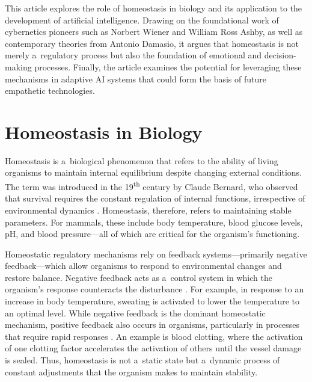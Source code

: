 \documentclass[%
  manuscript=article,
  year=2024,
  volume=77,
  doi=10.59203/zfn.77.706,
]{zfn}
\begin{document}
This article explores the role of homeostasis in biology and its application to the development of artificial intelligence. Drawing on the foundational work of cybernetics pioneers such as Norbert Wiener and William Ross Ashby, as well as contemporary theories from Antonio Damasio, it argues that homeostasis is not merely a~regulatory process but also the foundation of emotional and decision-making processes. Finally, the article examines the potential for leveraging these mechanisms in adaptive AI systems that could form the basis of future empathetic technologies.



\section*{Homeostasis in Biology}

Homeostasis is a~biological phenomenon that refers to the ability of living organisms to maintain internal equilibrium despite changing external conditions. The term was introduced in the 19\textsuperscript{th} century by Claude Bernard, who observed that survival requires the constant regulation of internal functions, irrespective of environmental dynamics 
\parencite[][]{fleming_walter_1984}. %
 Homeostasis, therefore, refers to maintaining stable parameters. For mammals, these include body temperature, blood glucose levels, pH, and blood pressure---all of which are critical for the organism's functioning.



Homeostatic regulatory mechanisms rely on feedback systems---primarily negative feedback---which allow organisms to respond to environmental changes and restore balance. Negative feedback acts as a~control system in which the organism's response counteracts the disturbance 
\parencites[][]{perrimon_negative_1999}[][]{bielecki_cybernetic_2016}[][]{hancock_interplay_2017}. %
 For example, in response to an increase in body temperature, sweating is activated to lower the temperature to an optimal level. While negative feedback is the dominant homeostatic mechanism, positive feedback also occurs in organisms, particularly in processes that require rapid responses 
\parencite[][]{peters_principle_2007}. %
 An example is blood clotting, where the activation of one clotting factor accelerates the activation of others until the vessel damage is sealed. Thus, homeostasis is not a~static state but a~dynamic process of constant adjustments that the organism makes to maintain stability.
\end{document}
